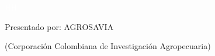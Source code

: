 \documentclass{article}%
\begin{document}
%
\begin{center}%
\textcolor{white}{ 
HH
}%
\linebreak%
\linebreak%
\linebreak%
\linebreak%
\linebreak%
\linebreak%
\linebreak%
\linebreak%
\begin{Large}%
Presentado por: AGROSAVIA%
\end{Large}%
\linebreak%
\begin{small}%
(Corporación Colombiana de Investigación Agropecuaria)%
\end{small}%
\end{center}%
\newpage%
\end{document}
